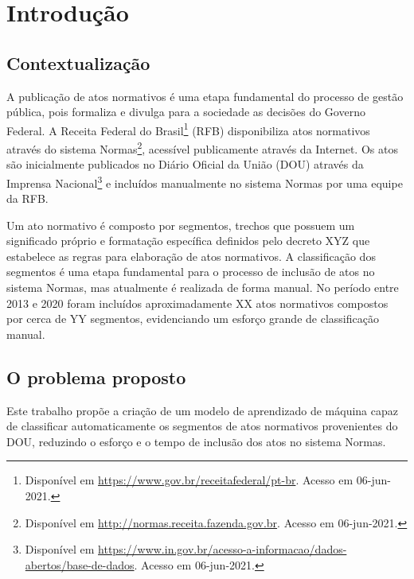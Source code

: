\chapter{Introdução}

\section{Contextualização}

A publicação de atos normativos é uma etapa fundamental do processo de gestão pública, pois formaliza e divulga para a sociedade as decisões do Governo Federal. A Receita Federal do Brasil\footnote{Disponível em \url{https://www.gov.br/receitafederal/pt-br}. Acesso em 06-jun-2021.} (RFB) disponibiliza atos normativos através do sistema Normas\footnote{Disponível em \url{http://normas.receita.fazenda.gov.br}. Acesso em 06-jun-2021.}, acessível publicamente através da Internet. Os atos são inicialmente publicados no Diário Oficial da União (DOU) através da Imprensa Nacional\footnote{Disponível em \url{https://www.in.gov.br/acesso-a-informacao/dados-abertos/base-de-dados}. Acesso em 06-jun-2021.} e incluídos manualmente no sistema Normas por uma equipe da RFB.

Um ato normativo é composto por segmentos, trechos que possuem um significado próprio e formatação específica definidos pelo decreto XYZ que estabelece as regras para elaboração de atos normativos. A classificação dos segmentos é uma etapa fundamental para o processo de inclusão de atos no sistema Normas, mas atualmente é realizada de forma manual. No período entre 2013 e 2020 foram incluídos aproximadamente XX atos normativos compostos por cerca de YY segmentos, evidenciando um esforço grande de classificação manual.

\section{O problema proposto}

Este trabalho propõe a criação de um modelo de aprendizado de máquina capaz de classificar automaticamente os segmentos de atos normativos provenientes do DOU, reduzindo o esforço e o tempo de inclusão dos atos no sistema Normas.     

